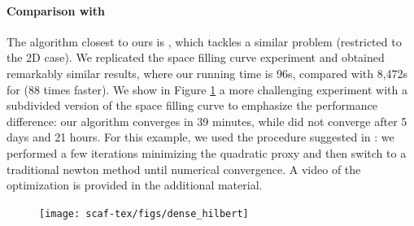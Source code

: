 \paragraph{Comparison with \cite{Smith:2015}}
The algorithm closest to ours is \cite{Smith:2015}, which tackles a similar problem (restricted to the 2D case). We replicated the space filling curve experiment and obtained remarkably similar results, where our running time is 96s, compared with 8,472s for \cite{Smith:2015} (88 times faster). We show in Figure \ref{scaf:fig:smith} a more challenging experiment with a subdivided version of the space filling curve to emphasize the performance difference: our algorithm converges in 39 minutes, while \cite{Smith:2015} did not converge after 5 days and 21 hours. For this example, we used the procedure suggested in \cite{Rabinovich:2017}: we performed a few iterations minimizing the quadratic proxy and then switch to a traditional newton method until numerical convergence. A video of the optimization is provided in the additional material.

\begin{figure}[t]
\texttt{[image: scaf-tex/figs/dense\_hilbert]}
\caption{}
\label{scaf:fig:smith}
\vspace{-0.2cm}
\end{figure}

